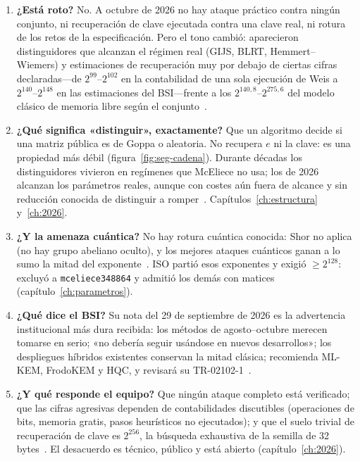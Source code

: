 \documentclass[11pt,a4paper,oneside]{report}
\begin{document}
\begin{enumerate}[leftmargin=1.9em,itemsep=5pt,start=12]
  \item \textbf{¿Está roto?} No. A octubre de 2026 no hay ataque
        práctico contra ningún conjunto, ni recuperación de clave
        ejecutada contra una clave real, ni rotura de los retos de
        la especificación. Pero el tono cambió: aparecieron
        distinguidores que alcanzan el régimen real (GIJS, BLRT,
        Hemmert--Wiemers) y estimaciones de recuperación muy por
        debajo de ciertas cifras declaradas---de $2^{99}$--$2^{102}$
        en la contabilidad de una sola ejecución de Weis a
        $2^{140}$--$2^{148}$ en las estimaciones del BSI---frente a
        los $2^{140{,}8}$--$2^{275{,}6}$ del modelo clásico de
        memoria libre según el conjunto~\cite{ghoshal2026,weis2026,bsi2026}.

  \item \textbf{¿Qué significa «distinguir», exactamente?} Que un
        algoritmo decide si una matriz pública es de Goppa o
        aleatoria. No recupera $e$ ni la clave: es una propiedad más
        débil (figura~\ref{fig:seg-cadena}). Durante décadas los
        distinguidores vivieron en regímenes que McEliece no usa;
        los de 2026 alcanzan los parámetros reales, aunque con
        costes aún fuera de alcance y sin reducción conocida de
        distinguir a romper~\cite{ghoshal2026}.
        Capítulos~\ref{ch:estructura} y~\ref{ch:2026}.

  \item \textbf{¿Y la amenaza cuántica?} No hay rotura cuántica
        conocida: Shor no aplica (no hay grupo abeliano oculto), y
        los mejores ataques cuánticos ganan a lo sumo la mitad del
        exponente~\cite{kachigar2017}. ISO partió esos exponentes y
        exigió $\ge2^{128}$: excluyó a \texttt{mceliece348864} y
        admitió los demás con matices~\cite{iso18033,cmiso}
        (capítulo~\ref{ch:parametros}).

  \item \textbf{¿Qué dice el BSI?} Su nota del 29 de septiembre de
        2026 es la advertencia institucional más dura recibida: los
        métodos de agosto--octubre merecen tomarse en serio; «no
        debería seguir usándose en nuevos desarrollos»; los
        despliegues híbridos existentes conservan la mitad clásica;
        recomienda ML-KEM, FrodoKEM y HQC, y revisará su
        TR-02102-1~\cite{bsi2026}.

  \item \textbf{¿Y qué responde el equipo?} Que ningún ataque
        completo está verificado; que las cifras agresivas dependen
        de contabilidades discutibles (operaciones de bits, memoria
        gratis, pasos heurísticos no ejecutados); y que el suelo
        trivial de recuperación de clave es $2^{256}$, la búsqueda
        exhaustiva de la semilla de 32 bytes~\cite{cm529,cm610,bernstein2026}.
        El desacuerdo es técnico, público y está abierto
        (capítulo~\ref{ch:2026}).
\end{enumerate}
\end{document}
